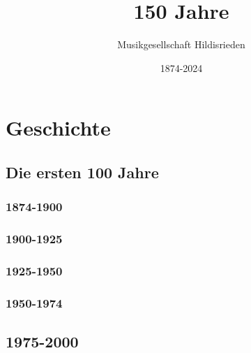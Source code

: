 \documentclass[]{book}
\title{150 Jahre}
\author{Musikgesellschaft Hildisrieden}
\date{1874-2024}
\begin{document}
\frontmatter
\maketitle
\tableofcontents

\mainmatter

\part{Geschichte}

\chapter{Die ersten 100 Jahre}


\section{1874-1900}




\section{1900-1925}

\clearpage

\section{1925-1950}

\clearpage

\section{1950-1974}


\chapter{1975-2000}





\end{document}
